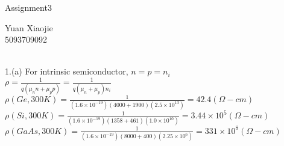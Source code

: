 \documentclass[11pt,oneside,a4paper]{article}
\begin{document}
\begin{center}Assignment3\\\end{center}
\begin{flushright}Yuan Xiaojie\\5093709092\\\end{flushright}

\ \\

1.\:(a) For intrinsic semiconductor, \(n=p=n_i\) \\

\hspace{8.5mm} \(\rho=\frac{1}{q(\mu_nn+\mu_pp)}=\frac{1}{q(\mu_n+\mu_p)n_i}\) \\

\hspace{8.5mm} \(\rho(Ge,300K)=\frac{1}{(1.6\times10^{-19})(4000+1900)(2.5\times10^{13})}=42.4 (\Omega-cm)\) \\

\hspace{8.5mm} \(\rho(Si,300K)=\frac{1}{(1.6\times10^{-19})(1358+461)(1.0\times10^{10})}=3.44\times10^5 (\Omega-cm)\) \\

\hspace{8.5mm} \(\rho(GaAs,300K)=\frac{1}{(1.6\times10^{-19})(8000+400)(2.25\times10^6)}=331\times10^8 (\Omega-cm)\) \\

\hspace{8.5mm} \(\) \\
\hspace{8.5mm} \(\) \\
\hspace{8.5mm} \(\) \\
\hspace{8.5mm} \(\) \\
\hspace{8.5mm} \(\) \\
\hspace{8.5mm} \(\) \\
\hspace{8.5mm} \(\) \\
\hspace{8.5mm} \(\) \\
\hspace{8.5mm} \(\) \\
\end{document}
